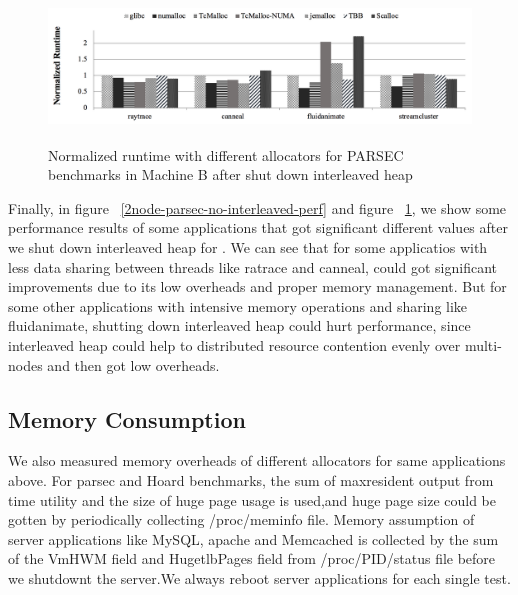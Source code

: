 \begin{figure}[H]
    \centering
    \includegraphics[width=\textwidth,height=150]{figure/8-node-no-interleaved.png}
    \caption{Normalized runtime with different allocators for PARSEC benchmarks in Machine B after shut down interleaved heap}
    \label{8node-parsec-no-interleaved-perf}
\end{figure}
Finally, in figure ~\ref{2node-parsec-no-interleaved-perf} and figure ~\ref{8node-parsec-no-interleaved-perf}, we show some performance results of some applications that got significant different values after we shut down interleaved heap for \NM{}. We can see that for some applicatios with less data sharing between threads like ratrace and canneal, \NM{} could got significant improvements due to its low overheads and proper memory management. But for some other applications with intensive memory operations and sharing like fluidanimate, shutting down interleaved heap could hurt performance, since interleaved heap could help to distributed resource contention evenly over multi-nodes and then got low overheads.

\subsection{Memory Consumption}
\label{sec:memory}

We also measured memory overheads of different allocators for same applications above. For parsec and Hoard benchmarks, the sum of maxresident output from time utility and the size of huge page usage is used,and huge page size could be gotten by periodically collecting /proc/meminfo file. Memory assumption of server applications like MySQL, apache and Memcached is collected by the sum of the VmHWM field and HugetlbPages field from /proc/PID/status file before we shutdownt the server.We always reboot server applications for each single test. 

